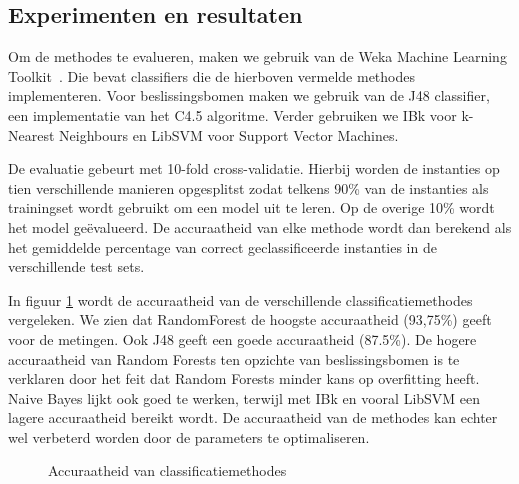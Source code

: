 \documentclass{article}
\begin{document}
\subsection{Experimenten en resultaten}
\label{afzonderlijk:experimenten}

Om de methodes te evalueren, maken we gebruik van de Weka Machine Learning Toolkit~\cite{waikato:weka}.
Die bevat classifiers die de hierboven vermelde methodes implementeren. Voor beslissingsbomen maken we gebruik van de J48 classifier, een implementatie van het C4.5 algoritme.
Verder gebruiken we IBk voor k-Nearest Neighbours en LibSVM voor Support Vector Machines.

De evaluatie gebeurt met 10-fold cross-validatie. Hierbij worden de instanties op tien verschillende manieren opgesplitst zodat telkens 90\% van de instanties als trainingset wordt gebruikt om een model uit te leren. Op de overige 10\% wordt het model ge\"evalueerd. De accuraatheid van elke methode wordt dan berekend als het gemiddelde percentage van correct geclassificeerde instanties in de verschillende test sets.

In figuur \ref{fig:methodes}
wordt de accuraatheid van de verschillende classificatiemethodes vergeleken. We zien dat RandomForest de hoogste accuraatheid (93,75\%) geeft voor de metingen. Ook J48 geeft een goede accuraatheid (87.5\%). De hogere accuraatheid van Random Forests ten opzichte van beslissingsbomen is te verklaren door het feit dat Random Forests minder kans op overfitting heeft.~\cite{breiman:randomforests} Naive Bayes lijkt ook goed te werken, terwijl met IBk en vooral LibSVM een lagere accuraatheid bereikt wordt. De accuraatheid van de methodes kan echter wel verbeterd worden door de parameters te optimaliseren.

\begin{figure}[h]
\centering
{}
\caption{Accuraatheid van classificatiemethodes}
\label{fig:methodes}
\end{figure}
\end{document}
